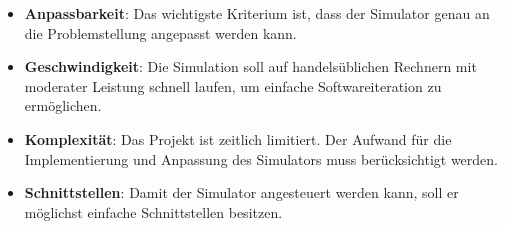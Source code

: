\begin{itemize}
\item \textbf{Anpassbarkeit}: Das wichtigste Kriterium ist, dass der Simulator genau an die Problemstellung angepasst werden kann.
\item \textbf{Geschwindigkeit}: Die Simulation soll auf handelsüblichen Rechnern mit moderater Leistung schnell laufen, um einfache Softwareiteration zu ermöglichen.  
\item \textbf{Komplexität}: Das Projekt ist zeitlich limitiert. Der Aufwand für die Implementierung und Anpassung des Simulators muss berücksichtigt werden.
\item \textbf{Schnittstellen}: Damit der Simulator angesteuert werden kann, soll er möglichst einfache Schnittstellen besitzen.
\end{itemize}

\begin{table}[H]
    \caption{Nutzwertanalyse Simulator}
    \label{tab:nutzwertanalyse_simulator}
\end{table}

